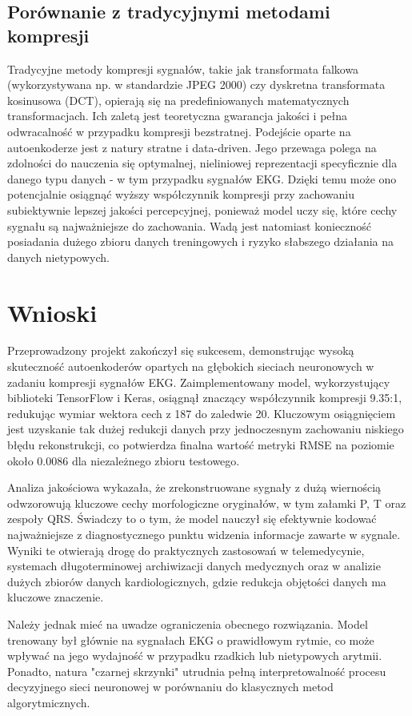 \documentclass[12pt,a4paper]{article}
\begin{document}
\subsection{Porównanie z tradycyjnymi metodami kompresji}

Tradycyjne metody kompresji sygnałów, takie jak transformata falkowa (wykorzystywana np. w standardzie JPEG 2000) czy dyskretna transformata kosinusowa (DCT), opierają się na predefiniowanych matematycznych transformacjach. Ich zaletą jest teoretyczna gwarancja jakości i pełna odwracalność w przypadku kompresji bezstratnej. Podejście oparte na autoenkoderze jest z natury stratne i data-driven. Jego przewaga polega na zdolności do nauczenia się optymalnej, nieliniowej reprezentacji specyficznie dla danego typu danych - w tym przypadku sygnałów EKG. Dzięki temu może ono potencjalnie osiągnąć wyższy współczynnik kompresji przy zachowaniu subiektywnie lepszej jakości percepcyjnej, ponieważ model uczy się, które cechy sygnału są najważniejsze do zachowania. Wadą jest natomiast konieczność posiadania dużego zbioru danych treningowych i ryzyko słabszego działania na danych nietypowych.

\section{Wnioski}

Przeprowadzony projekt zakończył się sukcesem, demonstrując wysoką skuteczność autoenkoderów opartych na głębokich sieciach neuronowych w zadaniu kompresji sygnałów EKG. Zaimplementowany model, wykorzystujący biblioteki TensorFlow i Keras, osiągnął znaczący współczynnik kompresji 9.35:1, redukując wymiar wektora cech z 187 do zaledwie 20. Kluczowym osiągnięciem jest uzyskanie tak dużej redukcji danych przy jednoczesnym zachowaniu niskiego błędu rekonstrukcji, co potwierdza finalna wartość metryki RMSE na poziomie około 0.0086 dla niezależnego zbioru testowego.

Analiza jakościowa wykazała, że zrekonstruowane sygnały z dużą wiernością odwzorowują kluczowe cechy morfologiczne oryginałów, w tym załamki P, T oraz zespoły QRS. Świadczy to o tym, że model nauczył się efektywnie kodować najważniejsze z diagnostycznego punktu widzenia informacje zawarte w sygnale. Wyniki te otwierają drogę do praktycznych zastosowań w telemedycynie, systemach długoterminowej archiwizacji danych medycznych oraz w analizie dużych zbiorów danych kardiologicznych, gdzie redukcja objętości danych ma kluczowe znaczenie.

Należy jednak mieć na uwadze ograniczenia obecnego rozwiązania. Model trenowany był głównie na sygnałach EKG o prawidłowym rytmie, co może wpływać na jego wydajność w przypadku rzadkich lub nietypowych arytmii. Ponadto, natura "czarnej skrzynki" utrudnia pełną interpretowalność procesu decyzyjnego sieci neuronowej w porównaniu do klasycznych metod algorytmicznych.
\end{document}

